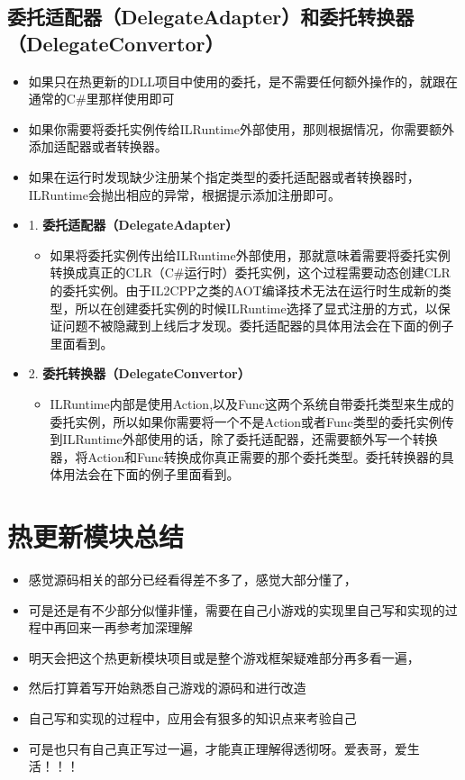 \documentclass[9pt, b5paper]{article}
\begin{document}
\subsection{委托适配器（DelegateAdapter）和委托转换器（DelegateConvertor）}
\label{sec-5-2}
\begin{itemize}
\item 如果只在热更新的DLL项目中使用的委托，是不需要任何额外操作的，就跟在通常的C\#里那样使用即可
\item 如果你需要将委托实例传给ILRuntime外部使用，那则根据情况，你需要额外添加适配器或者转换器。
\item 如果在运行时发现缺少注册某个指定类型的委托适配器或者转换器时，ILRuntime会抛出相应的异常，根据提示添加注册即可。
\item 1. \textbf{委托适配器（DelegateAdapter）}
\begin{itemize}
\item 如果将委托实例传出给ILRuntime外部使用，那就意味着需要将委托实例转换成真正的CLR（C\#运行时）委托实例，这个过程需要动态创建CLR的委托实例。由于IL2CPP之类的AOT编译技术无法在运行时生成新的类型，所以在创建委托实例的时候ILRuntime选择了显式注册的方式，以保证问题不被隐藏到上线后才发现。委托适配器的具体用法会在下面的例子里面看到。
\end{itemize}
\item 2. \textbf{委托转换器（DelegateConvertor）}
\begin{itemize}
\item ILRuntime内部是使用Action,以及Func这两个系统自带委托类型来生成的委托实例，所以如果你需要将一个不是Action或者Func类型的委托实例传到ILRuntime外部使用的话，除了委托适配器，还需要额外写一个转换器，将Action和Func转换成你真正需要的那个委托类型。委托转换器的具体用法会在下面的例子里面看到。
\end{itemize}
\end{itemize}

\section{热更新模块总结}
\label{sec-6}
\begin{itemize}
\item 感觉源码相关的部分已经看得差不多了，感觉大部分懂了，
\item 可是还是有不少部分似懂非懂，需要在自己小游戏的实现里自己写和实现的过程中再回来一再参考加深理解
\item 明天会把这个热更新模块项目或是整个游戏框架疑难部分再多看一遍，
\item 然后打算着写开始熟悉自己游戏的源码和进行改造
\item 自己写和实现的过程中，应用会有狠多的知识点来考验自己
\item 可是也只有自己真正写过一遍，才能真正理解得透彻呀。爱表哥，爱生活！！！
\end{itemize}
\subsection{}
\label{sec-6-1}
\end{document}
